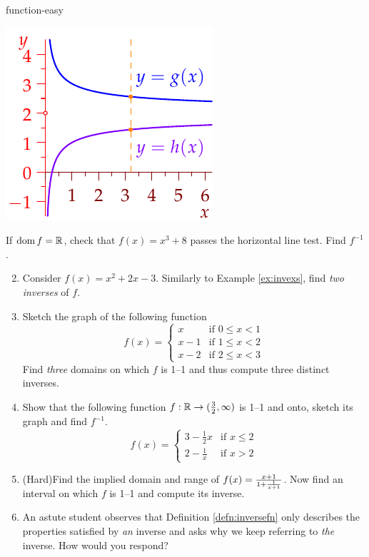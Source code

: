 \begin{example}{}{function-easy}
\begin{description}
\begin{minipage}[t]{0.31\linewidth}
			\includegraphics{functions-easyex2}
		\end{minipage}
	\end{description}
\end{example}



\begin{exercises}{}{}
	\exstart If $\operatorname{dom} f=\mathbb{R}$, check that $f(x)=x^3+8$ passes the horizontal line test. Find $f^{-1}$.
	
	\begin{enumerate}\setcounter{enumi}{1}
	  \item Consider $f(x)=x^2+2x-3$. Similarly to Example \ref{ex:invexs}, find \emph{two inverses} of $f$.
	  
	  \item Sketch the graph of the following function
	  \[
	  	f(x)=
	  	\begin{cases}
	  		x&\text{if }0\le x<1\\
	  		x-1&\text{if }1\le x<2\\
	  		x-2&\text{if }2\le x<3
	  	\end{cases}
	  \]
		Find \emph{three} domains on which $f$ is 1--1 and thus compute three distinct inverses.
	
	  \item Show that the following function $f:\mathbb{R}\to(\frac 32,\infty)$ is 1--1 and onto, sketch its graph and find $f^{-1}$. 
	  \[f(x)=\begin{cases}
	  3-\frac 12x&\text{if }x\le 2\\
	  2-\frac 1x&\text{if }x>2
	  \end{cases}\]
	  
	  \item (Hard)\lstsp Find the implied domain and range of $f(x)=\smash[b]{\frac{x+1}{1+\frac 1{x+1}}}$. Now find an interval on which $f$ is 1--1 and compute its inverse.
	  
	  \item An astute student observes that Definition \ref{defn:inversefn} only describes the properties satisfied by \emph{an} inverse and asks why we keep referring to \emph{the} inverse. How would you respond?
	  
	\end{enumerate}
\end{exercises}

